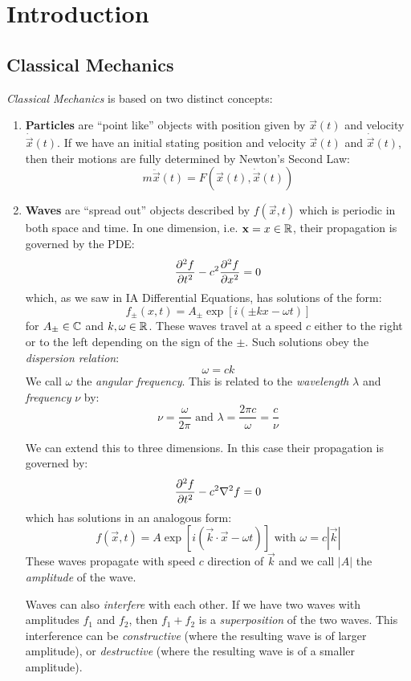 \documentclass[../main.tex]{subfiles}
\begin{document}
\chapter{Introduction}
\section{Classical Mechanics}
\textit{Classical Mechanics} is based on two distinct concepts:
\begin{enumerate}
  \item \textbf{Particles} are ``point like'' objects with position given by $\vec{x}(t)$ and velocity $\dot{\vec{x}}(t)$.
    If we have an initial stating position and velocity $\vec{x}(t)$ and $\dot{\vec{x}}(t)$, then their motions are fully determined by Newton's Second Law:
    \[
      m \ddot{\vec{x}}(t) = F(\vec{x}(t), \dot{\vec{x}}(t))
    \]
  \item \textbf{Waves} are ``spread out'' objects described by $f(\vec{x}, t)$ which is periodic in both space and time.
    In one dimension, i.e. $\mathbf{\bm{x}} = x \in \mathbb{R}$, their propagation is governed by the PDE:
    \[
      \pderiv[2]{f}{t} - c^2 \pderiv[2]{f}{x} = 0
    \]
    which, as we saw in IA Differential Equations, has solutions of the form:
    \begin{equation}
      f_{\pm}(x, t) = A_{\pm}\exp[i(\pm kx - \omega t)] \label{1DWaveSoln}
    \end{equation}
    for $A_{\pm} \in \mathbb{C}$ and $k, \omega \in \mathbb{R}$.
    These waves travel at a speed $c$ either to the right or to the left depending on the sign of the $\pm$.
    Such solutions obey the \textit{dispersion relation}:
    \[
      \omega = ck
    \]
    We call $\omega$ the \textit{angular frequency}.
    This is related to the \textit{wavelength} $\lambda$ and \textit{frequency} $\nu$ by:
    \[
      \nu = \frac{\omega}{2\pi} \text{ and } \lambda = \frac{2\pi c}{\omega} = \frac{c}{\nu}
    \]

    We can extend this to three dimensions.
    In this case their propagation is governed by:
    \[
      \pderiv[2]{f}{t} - c^2 \nabla^2 f = 0
    \]
    which has solutions in an analogous form:
    \[
      f(\vec{x}, t) = A \exp[i(\vec{k} \cdot \vec{x} - \omega t)] \text{ with } \omega = c |\vec{k}|
    \]
    These waves propagate with speed $c$ direction of $\vec{k}$ and we call $|A|$ the \textit{amplitude} of the wave.

    Waves can also \textit{interfere} with each other.
    If we have two waves with amplitudes $f_1$ and $f_2$, then $f_1 + f_2$ is a \textit{superposition} of the two waves.
    This interference can be \textit{constructive} (where the resulting wave is of larger amplitude), or \textit{destructive} (where the resulting wave is of a smaller amplitude).
\end{enumerate}
\end{document}
